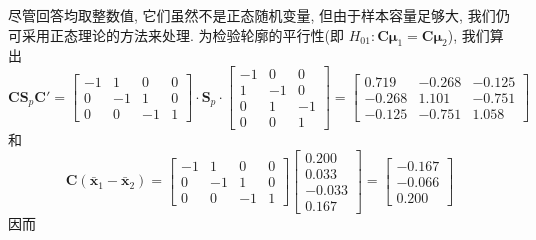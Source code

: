 尽管回答均取整数值, 它们虽然不是正态随机变量, 但由于样本容量足够大, 我们仍可采用正态理论的方法来处理. 为检验轮廓的平行性(即 $H_{01}: \mathbf{C}\boldsymbol{\mu}_1=\mathbf{C}\boldsymbol{\mu}_2$), 我们算出
\[
\mathbf{C}\mathbf{S}_p\mathbf{C}'=\begin{bmatrix}-1&1&0&0\\0&-1&1&0\\0&0&-1&1\end{bmatrix}\cdot\mathbf{S}_p\cdot\begin{bmatrix}-1&0&0\\1&-1&0\\0&1&-1\\0&0&1\end{bmatrix}
=\begin{bmatrix}0.719&-0.268&-0.125\\-0.268&1.101&-0.751\\-0.125&-0.751&1.058\end{bmatrix}
\]
和
\[
\mathbf{C}(\bar{\mathbf{x}}_1-\bar{\mathbf{x}}_2)=\begin{bmatrix}-1&1&0&0\\0&-1&1&0\\0&0&-1&1\end{bmatrix}\begin{bmatrix}0.200\\0.033\\-0.033\\0.167\end{bmatrix}=\begin{bmatrix}-0.167\\-0.066\\0.200\end{bmatrix}
\]
因而
